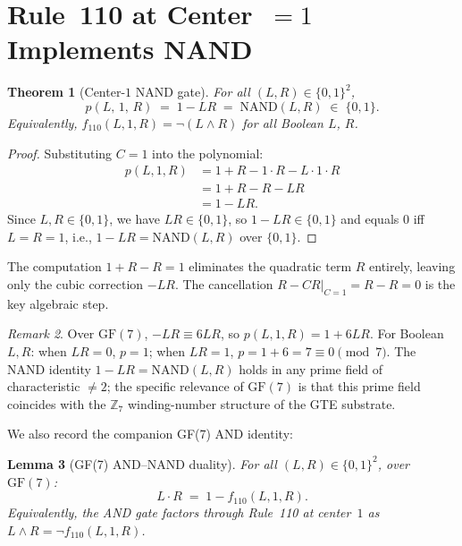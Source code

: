 \documentclass[11pt]{article}
\newtheorem{theorem}{Theorem}[section]
\newtheorem{lemma}[theorem]{Lemma}
\theoremstyle{remark}
\newtheorem{remark}[theorem]{Remark}
\begin{document}
\section{Rule~110 at Center~\texorpdfstring{$=1$}{=1} Implements NAND}
\label{sec:nand}

\begin{theorem}[Center-$1$ NAND gate]
\label{thm:nand}
For all $(L,R) \in \{0,1\}^2$,
\[
  p(L,\,1,\,R) \;=\; 1 - LR \;=\; \mathrm{NAND}(L,R) \;\in\; \{0,1\}.
\]
Equivalently, $f_{110}(L,1,R) = \neg(L \wedge R)$ for all Boolean $L$, $R$.
\end{theorem}

\begin{proof}
Substituting $C = 1$ into the polynomial:
\begin{align*}
  p(L,1,R) &= 1 + R - 1{\cdot}R - L{\cdot}1{\cdot}R \\
            &= 1 + R - R - LR \\
            &= 1 - LR.
\end{align*}
Since $L,R \in \{0,1\}$, we have $LR \in \{0,1\}$, so $1-LR \in \{0,1\}$
and equals $0$ iff $L = R = 1$, i.e., $1 - LR = \mathrm{NAND}(L,R)$ over
$\{0,1\}$.
\end{proof}

The computation $1 + R - R = 1$ eliminates the quadratic term $R$ entirely, leaving
only the cubic correction $-LR$.
The cancellation $R - CR \big|_{C=1} = R - R = 0$ is the key algebraic step.

\begin{remark}
Over $\mathrm{GF}(7)$, $-LR \equiv 6LR$, so $p(L,1,R) = 1 + 6LR$.
For Boolean $L,R$: when $LR = 0$, $p = 1$; when $LR = 1$, $p = 1+6 = 7 \equiv 0 \pmod{7}$.
The NAND identity $1 - LR = \mathrm{NAND}(L,R)$ holds in any prime field of characteristic $\neq 2$; the specific relevance of $\mathrm{GF}(7)$ is that this prime field coincides with the $\mathbb{Z}_7$ winding-number structure of the GTE substrate.
\end{remark}

We also record the companion GF(7) AND identity:

\begin{lemma}[GF(7) AND--NAND duality]
\label{lem:and_nand}
For all $(L,R) \in \{0,1\}^2$, over $\mathrm{GF}(7)$:
\[
  L \cdot R \;=\; 1 - f_{110}(L,1,R).
\]
Equivalently, the AND gate factors through Rule~110 at center~$1$ as
$L \wedge R = \neg f_{110}(L,1,R)$.
\end{lemma}
\end{document}
